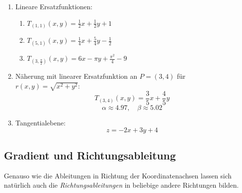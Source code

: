 \begin{enumerate}
	\item Lineare Ersatzfunktionen:
	      \begin{enumerate}
		      \item \( T_{(1,1)}(x, y) = \frac{1}{2}x + \frac{1}{2}y + 1 \)
		      \item \( T_{(5,1)}(x, y) = \frac{1}{4}x + \frac{5}{4}y - \frac{1}{2} \)
		      \item \( T_{\left(3, \frac{\pi}{2}\right)}(x, y) = 6x - \pi y + \frac{\pi^2}{4} - 9 \)
	      \end{enumerate}

	\item Näherung mit linearer Ersatzfunktion an \( P = (3,4) \) für \( r(x, y) = \sqrt{x^2 + y^2} \):
	      \[
		      T_{(3,4)}(x, y) = \frac{3}{5}x + \frac{4}{5}y
	      \]
	      \[
		      \alpha \approx 4.97, \quad \beta \approx 5.02
	      \]

	\item Tangentialebene:
	      \[
		      z = -2x + 3y + 4
	      \]

\end{enumerate}















\clearpage
\subsection{Gradient und Richtungsableitung}

Genauso wie die Ableitungen in Richtung der Koordinatenachsen lassen sich natürlich auch die \emph{Richtungsableitungen} in beliebige andere Richtungen bilden.

